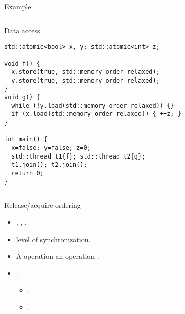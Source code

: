 \begin{frame}[fragile]{Example}
\begin{columns}

\begin{column}{.6\textwidth}
\begin{block}{Data access}
\begin{lstlisting}[basicstyle=\tiny]
std::atomic<bool> x, y; std::atomic<int> z;

void f() {
  x.store(true, std::memory_order_relaxed);
  y.store(true, std::memory_order_relaxed);
}
void g() {
  while (!y.load(std::memory_order_relaxed)) {}
  if (x.load(std::memory_order_relaxed)) { ++z; }
}

int main() {
  x=false; y=false; z=0;
  std::thread t1{f}; std::thread t2{g};
  t1.join(); t2.join();
  return 0;
}

\end{lstlisting}
\end{block}
\end{column}

\begin{column}{.4\textwidth}

\end{column}

\end{columns}
\end{frame}


\begin{frame}[t]{Release/acquire ordering}
\begin{itemize}
  \item {}, , .
  
  \item {} level of synchronization.
  
  \item A  operation  
         an  operation .
  
  \item {}:
    \begin{itemize}
      \item {}.
      \item {}.
    \end{itemize}
\end{itemize}
\end{frame}


